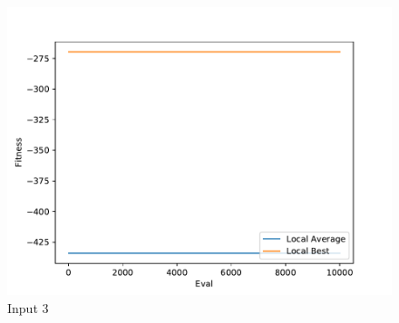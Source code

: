 \documentclass{standalone}
\begin{document}
\begin{figure}[!htb]
	\caption{Input 3}
	\label{fig:graph_3020}
	\includegraphics[width=\textwidth]{../graphs/graphs/3020.pdf}
\end{figure}
\end{document}
